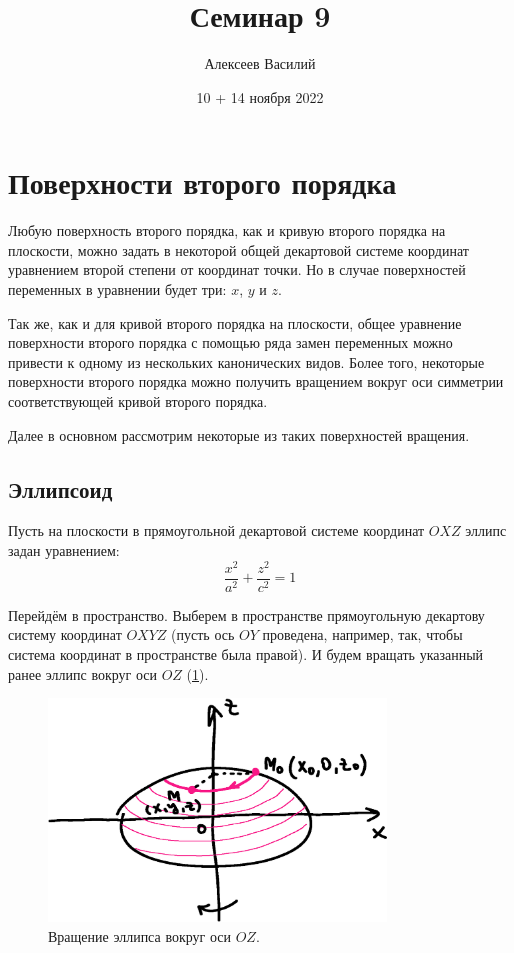 \documentclass[a4paper,12pt]{article}
\author{Алексеев Василий}
\title{Семинар 9}
\date{10 + 14 ноября 2022}
\begin{document}
  \maketitle
  
  \tableofcontents

  \thispagestyle{empty}
  
  \newpage
  


  \section{Поверхности второго порядка}
  
  Любую поверхность второго порядка, как и кривую второго порядка на плоскости, можно задать в некоторой общей декартовой системе координат уравнением второй степени от координат точки.
  Но в случае поверхностей переменных в уравнении будет три: $x$, $y$ и $z$.
  
  Так же, как и для кривой второго порядка на плоскости, общее уравнение поверхности второго порядка с помощью ряда замен переменных можно привести к одному из нескольких канонических видов.
  Более того, некоторые поверхности второго порядка можно получить вращением вокруг оси симметрии соответствующей кривой второго порядка.
  
  Далее в основном рассмотрим некоторые из таких поверхностей вращения.
  
  
  \subsection{Эллипсоид}
  
  Пусть на плоскости в прямоугольной декартовой системе координат $OXZ$ эллипс задан уравнением:
  \[
    \frac{x^2}{a^2} + \frac{z^2}{c^2} = 1
  \]
  
  Перейдём в пространство.
  Выберем в пространстве прямоугольную декартову систему координат $OXYZ$ (пусть ось $OY$ проведена, например, так, чтобы система координат в пространстве была правой).
  И будем вращать указанный ранее эллипс вокруг оси $OZ$ (\ref{fig:ellipse-rotate-1}).
  
  \begin{figure}[h]
    \centering

    \includegraphics[width=0.8\textwidth]{ellipse-rotate-1}
  
    \caption{Вращение эллипса вокруг оси $OZ$.}
    \label{fig:ellipse-rotate-1}
  \end{figure}
  
\end{document}
